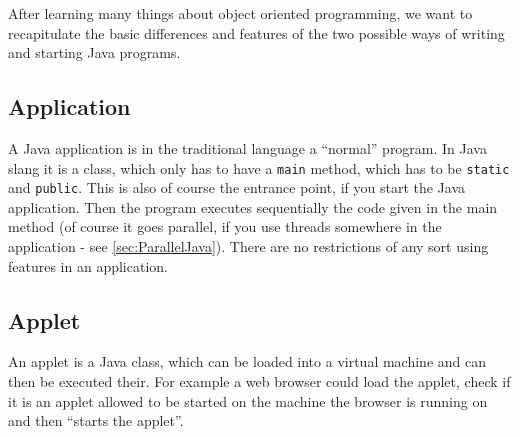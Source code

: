 After learning many things about object oriented programming,
we want to recapitulate the basic differences and features of
the two possible ways of writing and starting Java programs.

\subsection{Application}
A Java application is in the traditional language a ``normal'' program.
In Java slang it is a class, which only has to have a \verb|main|
method, which has to be \verb|static| and \verb|public|. This is also of course the
entrance point, if you start the Java application. Then the program
executes sequentially the code given in the main method (of course it
goes parallel, if you use threads somewhere in the application - see
\ref{sec:ParallelJava}). There are no restrictions of any sort using
features in an application.


\subsection{Applet}
An applet is a Java class, which can be loaded into a virtual machine
and can then be executed their. For example a web browser could load
the applet, check if it is an applet allowed to be started on the
machine the browser is running on and then ``starts the applet''.

